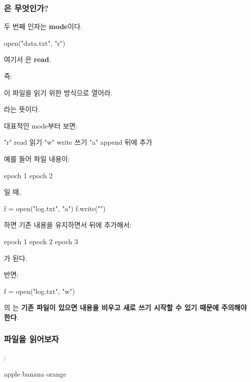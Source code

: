 \subsubsection{은 무엇인가?}

두 번째 인자는 \textbf{mode}이다.

\begin{dhkcode}
open("data.txt", "r")
\end{dhkcode}

여기서 은 \textbf{read}.

즉:

\begin{dhksmry}
이 파일을 읽기 위한 방식으로 열어라.
\end{dhksmry}

라는 뜻이다.

대표적인 mode부터 보면:

\begin{dhksmry}
    "r" read   읽기
    "w" write  쓰기
    "a" append 뒤에 추가
\end{dhksmry}

예를 들어 파일 내용이:

\begin{dhkcode}
epoch 1
epoch 2
\end{dhkcode}

일 때,

\begin{dhkcode}
f = open("log.txt", "a")
f.write("\n")
\end{dhkcode}

하면 기존 내용을 유지하면서 뒤에 추가해서:

\begin{dhkzsh}
epoch 1
epoch 2
epoch 3
\end{dhkzsh}

가 된다.

반면:

\begin{dhkcode}
f = open("log.txt", "w")
\end{dhkcode}

의 는 \textbf{기존 파일이 있으면 내용을 비우고 새로 쓰기 시작할 수 있기 때문에 주의해야 한다}.

\subsubsection{파일을 읽어보자}

:

\begin{dhkcode}
apple
banana
orange
\end{dhkcode}

